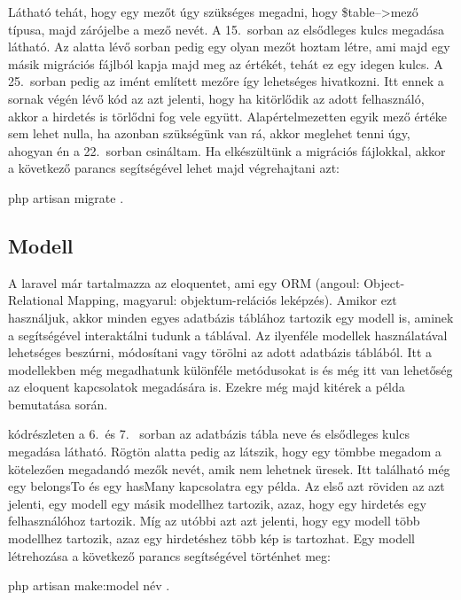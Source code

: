 \documentclass[]{thesis-ekf}
\theoremstyle{definition}
\theoremstyle{remark}
\begin{document}
	
	
	Látható tehát, hogy egy mezőt úgy szükséges megadni, hogy \$table-->mező típusa, majd zárójelbe a mező nevét.
	A 15.~sorban az elsődleges kulcs megadása látható. Az alatta lévő sorban pedig egy olyan mezőt hoztam létre, ami majd egy másik migrációs fájlból kapja majd meg az értékét, tehát ez egy idegen kulcs. A 25.~sorban pedig az imént említett mezőre így lehetséges hivatkozni. Itt ennek a sornak végén lévő kód az azt jelenti, hogy ha kitörlődik az adott felhasználó, akkor a hirdetés is törlődni fog vele együtt. Alapértelmezetten egyik mező értéke sem lehet nulla, ha azonban szükségünk van rá, akkor meglehet tenni úgy, ahogyan én a 22.~sorban csináltam. Ha elkészültünk a migrációs fájlokkal, akkor a következő parancs segítségével lehet majd végrehajtani azt:
	\begin{center}
		php artisan migrate .
	\end{center}
	\subsection{Modell}
	A laravel már tartalmazza az eloquentet, ami egy ORM (angoul: Object-Relational Mapping, magyarul: objektum-relációs leképzés). Amikor ezt használjuk, akkor minden egyes adatbázis táblához tartozik egy modell is, aminek a segítségével interaktálni tudunk a táblával. Az ilyenféle modellek használatával lehetséges beszúrni, módosítani vagy törölni az adott adatbázis táblából. Itt a modellekben még megadhatunk különféle metódusokat is és még itt van lehetőség az eloquent kapcsolatok megadására is. Ezekre még majd kitérek a példa bemutatása során.\cite{Laravel}
	
	
	
	 kódrészleten a 6.~és 7.~ sorban az adatbázis tábla neve és elsődleges kulcs megadása látható. Rögtön alatta pedig az látszik, hogy egy tömbbe megadom a kötelezően megadandó mezők nevét, amik nem lehetnek üresek. Itt található még egy belongsTo és egy hasMany kapcsolatra egy példa. Az első azt röviden az azt jelenti, egy modell egy másik modellhez tartozik, azaz, hogy egy hirdetés egy felhasználóhoz tartozik. Míg az utóbbi azt azt jelenti, hogy egy modell több modellhez tartozik, azaz egy hirdetéshez több kép is tartozhat. Egy modell létrehozása a következő parancs segítségével történhet meg:
	\begin{center} 
		php artisan make:model név .
	\end{center}
	
\end{document}
